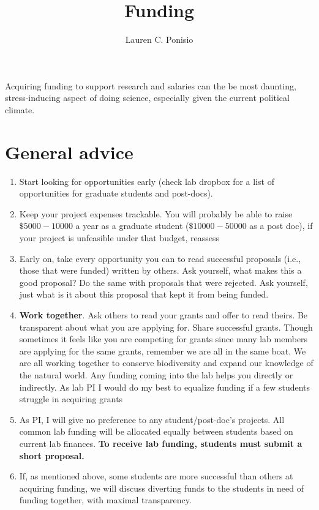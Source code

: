 \documentclass[12pt]{article}
\title{Funding}
\author{Lauren C. Ponisio}
\begin{document}
\maketitle

Acquiring funding to support research and salaries can the be most
daunting, stress-inducing aspect of doing science, especially given
the current political climate.

\section{General advice}

\begin{enumerate}
\item Start looking for opportunities early (check lab dropbox for a
  list of opportunities for graduate students and post-docs).
\item Keep your project expenses trackable. You will probably be able
  to raise $\$5000-10000$ a year as a graduate student
  ($\$10000-50000$ as a post doc), if your project is unfeasible under
  that budget, reassess
\item Early on, take every opportunity you can to read successful
  proposals (i.e., those that were funded) written by others. Ask
  yourself, what makes this a good proposal? Do the same with
  proposals that were rejected. Ask yourself, just what is it about
  this proposal that kept it from being funded. 
\item \textbf{Work together}. Ask others to read your grants and offer
  to read theirs. Be transparent about what you are applying
  for. Share successful grants. Though sometimes it feels like you are
  competing for grants since many lab members are applying for the
  same grants, remember we are all in the same boat. We are all
  working together to conserve biodiversity and expand our knowledge
  of the natural world. Any funding coming into the lab helps you
  directly or indirectly. As lab PI I would do my best to equalize
  funding if a few students struggle in acquiring grants
\item As PI, I will give no preference to any student/post-doc's
  projects. All common lab funding will be allocated equally between
  students based on current lab finances. \textbf{To receive lab
    funding, students must submit a short proposal.}
\item If, as mentioned above, some students are more successful than
  others at acquiring funding, we will discuss diverting funds to the
  students in need of funding together, with maximal transparency.
\end{enumerate}
\end{document}
